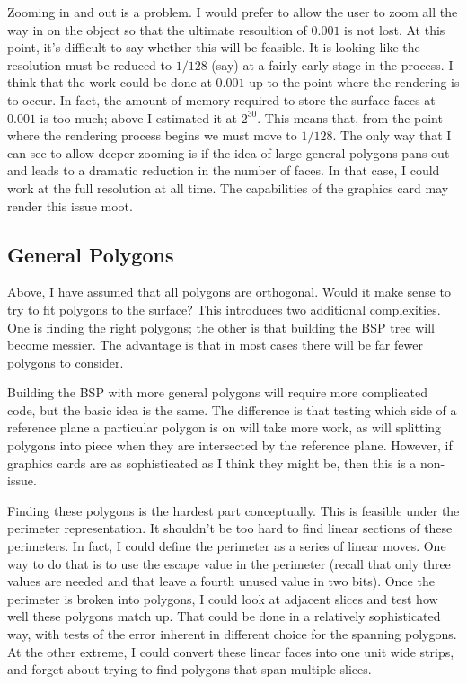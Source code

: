\documentclass[titlepage,oneside,10pt]{article}
\begin{document}
Zooming in and out is a problem. I would prefer to allow the user to
zoom all the way in on the object so that the ultimate resoultion of
$0.001$ is not lost. At this point, it's difficult to say whether this
will be feasible. It is looking like the resolution must be reduced to
$1/128$ (say) at a fairly early stage in the process. I think that the
work could be done at $0.001$ up to the point where the rendering is
to occur. In fact, the amount of memory required to store the surface
faces at $0.001$ is too much; above I estimated it at $2^{30}$. This
means that, from the point where the rendering process begins we must
move to $1/128$. The only way that I can see to allow deeper zooming
is if the idea of large general polygons pans out and leads to a
dramatic reduction in the number of faces. In that case, I could work
at the full resolution at all time. The capabilities of the graphics
card may render this issue moot.

\subsection{General Polygons}

Above, I have assumed that all polygons are orthogonal. Would it make
sense to try to fit polygons to the surface? This introduces two
additional complexities. One is finding the right polygons; the other
is that building the BSP tree will become messier. The advantage is
that in most cases there will be far fewer polygons to consider.

Building the BSP with more general polygons will require more
complicated code, but the basic idea is the same. The difference is
that testing which side of a reference plane a particular polygon is
on will take more work, as will splitting polygons into piece when
they are intersected by the reference plane. However, if graphics
cards are as sophisticated as I think they might be, then this is a
non-issue.

Finding these polygons is the hardest part conceptually. This is
feasible under the perimeter representation. It shouldn't be too hard
to find linear sections of these perimeters. In fact, I could define
the perimeter as a series of linear moves. One way to do that is to
use the escape value in the perimeter (recall that only three values
are needed and that leave a fourth unused value in two bits). Once the
perimeter is broken into polygons, I could look at adjacent slices and
test how well these polygons match up. That could be done in a
relatively sophisticated way, with tests of the error inherent in
different choice for the spanning polygons. At the other extreme, I
could convert these linear faces into one unit wide strips, and forget
about trying to find polygons that span multiple slices.
\end{document}
